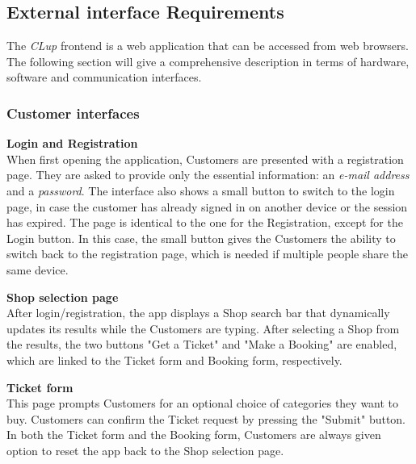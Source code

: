 \subsection{External interface Requirements}
The \emph{CLup} frontend is a web application that can be accessed from web browsers.  The following section will give a comprehensive description in terms of hardware, software and communication interfaces.

\subsubsection{Customer interfaces}
\textbf{Login and Registration}\\
\label{page:login}
When first opening the application, Customers are presented with a registration page. They are asked to provide only the essential information: an \emph{e-mail address} and a \emph{password}. The interface also shows a small button to switch to the login page, in case the customer has already signed in on another device or the session has expired. The page is identical to the one for the Registration, except for the Login button. In this case, the small button gives the Customers the ability to switch back to the registration page, which is needed if multiple people share the same device.


\textbf{Shop selection page}\\
\label{page:home}
After login/registration, the app displays a Shop search bar that dynamically updates its results while the Customers are typing. After selecting a Shop from the results, the two buttons "Get a Ticket" and "Make a Booking" are enabled, which are linked to the Ticket form and Booking form, respectively.

\textbf{Ticket form}\\
\label{page:ticket_form}
This page prompts Customers for an optional choice of categories they want to buy. Customers can confirm the Ticket request by pressing the "Submit" button. In both the Ticket form and the Booking form, Customers are always given option to reset the app back to the Shop selection page.

